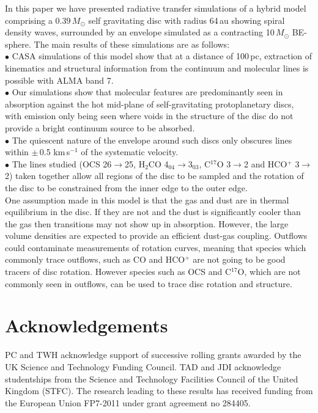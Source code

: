 \documentclass[useAMS,usenatbib]{mn2e}
\begin{document}
In this paper we have presented radiative transfer simulations of a hybrid model comprising a 0.39$\, M_\odot$ self gravitating disc with radius 64$\,$au showing spiral density waves, surrounded by an envelope simulated as a contracting 10$\,M_\odot$ BE-sphere. The main results of these simulations are as follows:\\
$\bullet$ CASA simulations of this model show that at a distance of 100$\,$pc, extraction of kinematics and structural information from the continuum and molecular lines is possible with ALMA band 7.\\
$\bullet$ Our simulations show that molecular features are predominantly seen in absorption against the hot mid-plane of self-gravitating protoplanetary discs, with emission only being seen where voids in the structure of the disc do not provide a bright continuum source to be absorbed.\\
$\bullet$ The quiescent nature of the envelope around such discs only obscures lines within $\pm\,$0.5 km$\,$s$^{-1}$ of the systematic velocity.\\
$\bullet$ The lines studied (OCS 26$\rightarrow$25, H$_2$CO 4$_{04}$$\rightarrow$3$_{03}$, C$^{17}$O 3$\rightarrow$2 and HCO$^+$ 3$\rightarrow$2) taken together allow all regions of the disc to be sampled and the rotation of the disc to be constrained from the inner edge to the outer edge.\\


One assumption made in this model is that the gas and dust are in thermal equilibrium in the disc. If they are not and the dust is significantly cooler than the gas then transitions may not show up in absorption. However, the large volume densities are expected to provide an efficient dust-gas coupling. Outflows could contaminate measurements of rotation curves, meaning that species  which commonly trace outflows, such as CO and HCO$^+$ are not going to be good tracers of disc rotation. However species such as OCS and C$^{17}$O, which are not commonly seen in outflows, can be used to trace disc rotation and structure.\smallskip

\section*{Acknowledgements}
PC and TWH acknowledge support of successive rolling grants awarded by the UK Science and Technology Funding Council. 
TAD and JDI acknowledge studentships from the Science and Technology Facilities Council of the United Kingdom (STFC).
The research leading to these results has received funding from the European Union FP7-2011 under grant agreement no 284405.
\end{document}

